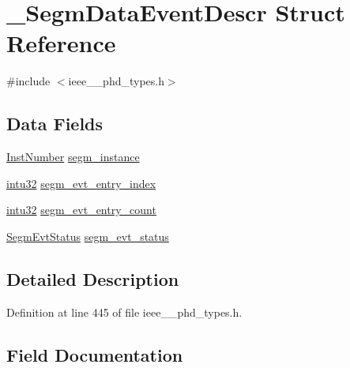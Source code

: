 \hypertarget{struct___segm_data_event_descr}{}\section{\+\_\+\+Segm\+Data\+Event\+Descr Struct Reference}
\label{struct___segm_data_event_descr}


{\ttfamily \#include $<$ieee\+\_\+\_\+phd\+\_\+types.\+h$>$}

\subsection*{Data Fields}
\begin{DoxyCompactItemize}
\item 
\hyperlink{ieee__11073__phd__types_8h_ab78fcfd5f6e61b2c8de677df291cc4d7}{Inst\+Number} \hyperlink{struct___segm_data_event_descr_a2387f49d78e281ef904794ca400cb308}{segm\+\_\+instance}
\item 
\hyperlink{ieee__11073__phd__types_8h_a22fd02d9fb90b079261a56b300e7f3c1}{intu32} \hyperlink{struct___segm_data_event_descr_a6840ddca72d58da544011e514f049663}{segm\+\_\+evt\+\_\+entry\+\_\+index}
\item 
\hyperlink{ieee__11073__phd__types_8h_a22fd02d9fb90b079261a56b300e7f3c1}{intu32} \hyperlink{struct___segm_data_event_descr_a5cb89f5d07f30c18c5a2cfd7b1db4a57}{segm\+\_\+evt\+\_\+entry\+\_\+count}
\item 
\hyperlink{ieee__11073__phd__types_8h_a9c33f08c786b85cb20d8fb2b1dd33f22}{Segm\+Evt\+Status} \hyperlink{struct___segm_data_event_descr_a39f780d172e087b78a0d37758851bd64}{segm\+\_\+evt\+\_\+status}
\end{DoxyCompactItemize}


\subsection{Detailed Description}


Definition at line 445 of file ieee\+\_\+\_\+phd\+\_\+types.\+h.



\subsection{Field Documentation}
\hypertarget{struct___segm_data_event_descr_a5cb89f5d07f30c18c5a2cfd7b1db4a57}{}
